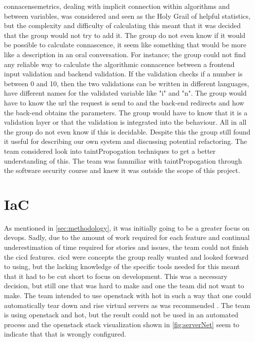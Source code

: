 \Gls{connacensemetrics}, dealing with implicit connection within algorithms and between variables, was considered and seen as the Holy Grail of helpful statistics, but the complexity and difficulty of calculating this meant that it was decided that the group would not try to add it. The group do not even know if it would be possible to calculate connascence, it seem like something that would be more like a description in an oral conversation. For instance; the group could not find any reliable way to calculate the algorithmic connacence between a \gls{frontend} input validation and \gls{backend} validation. If the validation checks if a number is between 0 and 10, then the two validations can be written in different languages, have different names for the validated variable like "i" and "n". The group would have to know the \gls{url} the request is send to and the back-end redirects and how the back-end obtains the parameters. The group would have to know that it is a validation layer or that the validation is integrated into the behaviour. All in all the group do not even know if this is decidable. Despite this the group still found it useful for describing our own system and discussing potential refactoring. The team considered look into \gls{taintPropogation} techniques to get a better understanding of this. The team was fammiliar with \Gls{taintPropogation} through the software security course \cite{course:softSec} and knew it was outside the scope of this project.  

\section{IaC}
As mentioned in \ref{sec:methodology}, it was initially going to be a greater focus on \gls{devops}. Sadly, due to the amount of work required for each feature and continual underestimation of time required for stories and issues, the team could not finish the \gls{cicd} features. \gls{cicd} were concepts the group really wanted and looked forward to using, but the lacking knowledge of the specific tools needed for this meant that it had to be cut short to focus on development. This was a necessary decision, but still one that was hard to make and one the team did not want to make. The team intended to use \gls{openstack} with \gls{hot} in such a way that one could automatically tear down and rise virtual servers as was recommended \cite{morris2016infrastructure}. The team is using \gls{openstack} and \gls{hot}, but the result could not be used in an automated process and the \gls{openstack} stack visualization shown in \ref{fig:serverNet} seem to indicate that that is wrongly configured.

